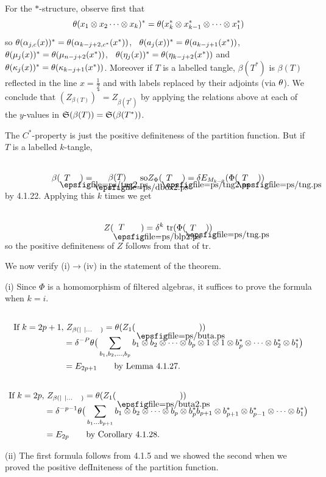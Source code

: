 For the $*$-structure, observe first that
$$
\theta(x_1\otimes x_2\dots\otimes x_k)^* =
\theta(x_k^*\otimes x_{k-1}^*\otimes\dots\otimes x_1^*)
$$
so
$\theta(\alpha_{j,c}(x))^*=\theta(\alpha_{k-j+2,c^*}(x^*))$, \
$\theta(a_j(x))^*=\theta(a_{k-j+1}(x^*))$, \
$\theta(\mu_j(x))^*=\theta(\mu_{n-j+2}(x^*))$, \
$\theta(\eta_j(x))^*=\theta(\eta_{k-j+2}(x^*))$ and
$\theta(\kappa_j(x))^*=\theta(\kappa_{k-j+1}(x^*))$.
Moreover if $T$ is a labelled tangle, $\beta(T^*)$ is $\beta(T)$
reflected in the line $x=\frac 12$ and with labels replaced by
their adjoints (via $\theta$). We conclude that
$(Z_{\beta(T)})^*=Z_{\beta(T^*)}$ by applying the relations above
at each of the $y$-values in $\frak S(\beta(T))=\frak
S(\beta(T^*))$.

The $C^*$-property is just the positive definiteness of the
partition function. But if $T$ is a labelled $k$-tangle,
\[
\beta(\tangler{T}\ ) = \dtangle{\beta (T)} \ \ \ \ \mbox{so}
Z_{\Phi}(\tangler{T}\ )  =\d E_{M_{k-2}}(\Phi(\tangle{T}\ ))
\]
by 4.1.22.  Applying this $k$ times we get
\[
Z(\boxrloop{T} ) =
\d^k \ {\op{tr}}(\Phi(\tangle{T}\ ))
\]
so the positive definiteness of $Z$ follows from that of tr.

We now verify (i)$\to$(iv) in the statement of the theorem.

\smallskip
(i) Since $\Phi$ is a homomorphism of filtered algebras, it
suffices to prove the formula when $k=i$.
\begin{eqnarray*}
{\mbox{If}} \ k=2p+1, & \ Z_{\beta( | \ |\dots \quad )}= \th(Z_1( \butau )) \\
& = \d^{-P}\th\big( \sum_{b_1,b_2,\dots ,b_p} b_1\otimes b_2\otimes\dots \otimes b_p\otimes 1\otimes 1\otimes b^*_p \otimes\dots \otimes b^*_2\otimes b^*_1\big) \\
& = E_{2p+1} \qquad {\mbox{by Lemma 4.1.27.}}\vspace{2\jot}\\
\end{eqnarray*}
\begin{eqnarray*}
{\mbox {If  $k=2p$}},& \ Z_{\beta( | \ |\dots \quad )} =  \th(Z_1(\butad )) \\
&= \d^{-p-1}\th\big(\sum_{b_1\dots b_{p+1}} b_1\otimes b_2\otimes\dots \otimes b_p\otimes b^*_p b_{p+1}\otimes b^*_{p+1}\otimes b^*_{p-1} \otimes\dots \otimes b^*_1\big) \\
&= E_{2p} \qquad {\mbox{by  Corollary 4.1.28}}.
\end{eqnarray*}

(ii) The first formula follows from 4.1.5 and we showed the second
when we proved the positive defIniteness of the partition function.

